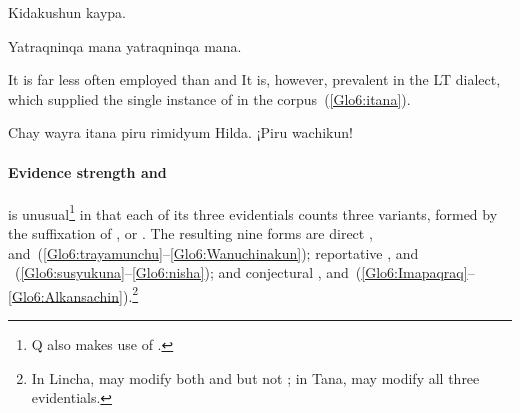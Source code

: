 %
{Kidakushun kaypa.}%
{}%
{}{}%

%
{Yatraqninqa mana yatraqninqa mana.}%
{}%
{}{}%

\noindent
It is far less often employed than  and  It is, however, prevalent in the LT dialect\phono, which supplied the single instance of  in the corpus~(\ref{Glo6:itana}).


%
{Chay wayra itana piru rimidyum Hilda. ¡Piru wachikun!}%
{}%
{}{}%

\paragraph{Evidence strength  and }\label{par:evistre}
\SYQ{} is unusual\footnote{ Q also makes use of .} in that each of its three evidentials counts three variants, formed by the suffixation of \phono{-\uo},  or . The resulting nine forms are direct ,  and~(\ref{Glo6:trayamunchu}--\ref{Glo6:Wanuchinakun}); reportative ,  and ~(\ref{Glo6:susyukuna}--\ref{Glo6:nisha}); and conjectural ,  and~(\ref{Glo6:Imapaqraq}--\ref{Glo6:Alkansachin}).\footnote{In Lincha,  may modify both  and  but not ; in Tana,  may modify all three evidentials.}


